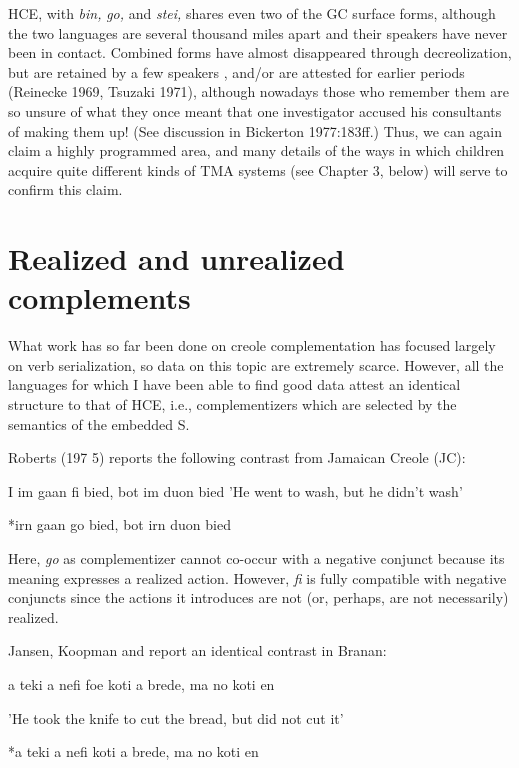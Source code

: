 HCE, with \textit{bin,} \textit{go,} and \textit{stei,} shares even two of the GC surface forms, although the two languages are several thousand miles apart and their speakers have never been in contact. Combined forms have almost disappeared through decreolization, but are retained by a few speakers \citep{Bickerton1974}, and/or are attested for earlier periods (Reinecke 1969, Tsuzaki 1971), although nowadays those who remember them are so unsure of what they once meant that one investigator \citep{Perlman1973} accused his consultants of making them up! (See discussion in Bickerton 1977:183ff.) Thus, we can again claim a highly programmed area, and many details of the ways in which children acquire quite different kinds of TMA systems (see Chapter 3, below) will serve to confirm this claim.

\section{Realized and unrealized complements}

What work has so far been done on creole complementation has focused largely on verb serialization, so data on this topic are extremely scarce. However, all the languages for which I have been able to find good data attest an identical structure to that of HCE, i.e., complementizers which are selected by the semantics of the em\-bedded S.

Roberts (197 5) reports the following contrast from Jamaican Creole (JC):

\ea\label{ex:27}
I im gaan fi bied, bot im duon bied
\glt
\z
'He went to wash, but he didn't wash'

\ea\label{ex:28}
 *irn gaan go bied, bot irn duon bied
\glt
\z

Here, \textit{go }as complementizer cannot co-occur with a negative conjunct because its meaning expresses a realized action. However, \textit{fi} is fully
compatible with negative conjuncts since the actions it introduces are not (or, perhaps, are not necessarily) realized.

Jansen, Koopman and \citet{Muysken1978} report an identical con\-trast in Branan:

\ea\label{ex:29}
 a teki a nefi foe koti a brede, ma no koti en
\glt
\z

'He took the knife to cut the bread, but did not cut it'

\ea\label{ex:30}
 *a teki a nefi koti a brede, ma no koti en
\glt
\z

